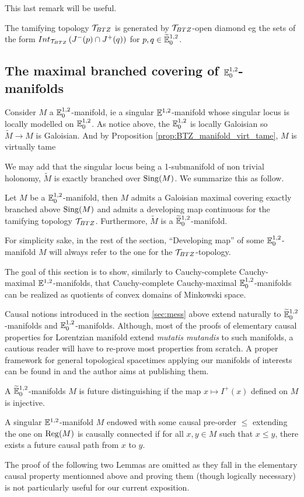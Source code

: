 This last remark will be useful.
\begin{rem} The tamifying topology $\mathcal{T}_{BTZ}$ is generated by $\mathcal{T}_{BTZ}$-open diamond eg the sets of the form $Int_{\mathcal{T}_{BTZ}}\left(J^{-}(p)\cap J^{+}(q)\right)$ for $p,q\in {\widetilde {\mathbb{E}}}^{1,2}_0$.
\end{rem}






\subsection{The maximal branched covering of ${\mathbb E}^{1,2}_{0}$-manifolds}

Consider $M$ a ${\mathbb E}^{1,2}_{0}$-manifold, ie a singular ${\mathbb E}^{1,2}_{}$-manifold whose singular locus is locally modelled on ${\mathbb E}^{1,2}_{0}$. As notice above, the $\mathbb{E}^{1,2}_0$ is locally Galoisian so $\widetilde M\rightarrow M$ is Galoisian.
And by Proposition \ref{prop:BTZ_manifold_virt_tame}, $M$ is virtually tame 

We may add that the singular locus being a 1-submanifold of non trivial holonomy, $\widetilde M$ is exactly branched over $\mathrm{Sing}(M)$.
We summarize this as follow.
\begin{prop} Let $M$ be a ${\mathbb E}^{1,2}_{0}$-manifold, then $M$ admits a Galoisian maximal covering exactly branched above $\mathrm{Sing}(M)$ and admits a developing map continuous for the tamifying topology $\mathcal{T}_{BTZ}$.
Furthermore, $\widetilde M$ is a ${\widetilde {\mathbb{E}}}^{1,2}_0$-manifold.
\end{prop}
For simplicity sake, in the rest of the section, ``Developing map'' of some $\mathbb{E}^{1,2}_0$-manifold $M$ will always refer to the one for the $\mathcal{T}_{BTZ}$-topology.


The goal of this section is to show, similarly to Cauchy-complete Cauchy-maximal ${\mathbb E}^{1,2}_{}$-manifolds, that Cauchy-complete Cauchy-maximal ${\mathbb E}^{1,2}_{0}$-manifolds can be realized as quotients of convex domains of Minkowski space.

Causal notions introduced in the section \ref{sec:mess} above extend naturally to ${\widetilde {\mathbb{E}}}^{1,2}_0$-manifolds and $\mathbb{E}^{1,2}_0$-manifolds. Although, most of the proofs of elementary causal properties for Lorentzian manifold extend {\it mutatis mutandis} to such manifolds, a cautious reader will have to re-prove most properties from scratch. A proper framework for general topological spacetimes applying our manifolds of interests can be found in \cite{thesis} and the author aims at publishing them. 
\begin{defi} A ${\widetilde {\mathbb{E}}}^{1,2}_0$-manifolds $M$ is future distinguishing if the map $x\mapsto I^+(x)$ defined on $M$ is injective.
\end{defi}
\begin{defi}
 A singular ${\mathbb E}^{1,2}_{}$-manifold $M$ endowed with some causal pre-order $\leq$ extending the one on $\mathrm{Reg}(M)$ is causally connected if 
for all $x,y\in M$ such that  $x\leq y$, there exists a future causal path from $x$ to $y$.
\end{defi}
The proof of the following two Lemmas are omitted as they fall in the elementary causal property mentionned above and proving them (though logically necessary) is not particularly useful for our current exposition.

